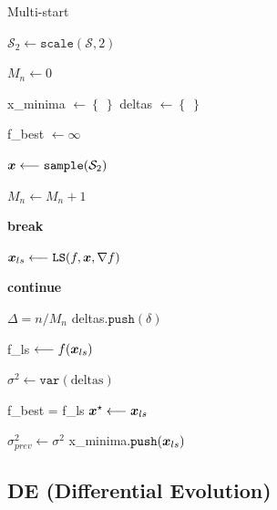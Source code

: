\begin{algorithm}
\caption{Multi-start}\label{algo:multistart}
\vspace{8pt}
\nosemic
\SetAlgoLined
{}

$\mathcal{S}_2 \longleftarrow \texttt{scale}(\mathcal{S}, 2) $ \;

$M_n \longleftarrow 0$ \;

x\_minima $ \longleftarrow \left\lbrace \: \right\rbrace$ \;
deltas $ \longleftarrow \left\lbrace \: \right\rbrace$ \;

f\_best $\longleftarrow \infty$ \;

 {

     {
        $\boldsymbol{x} \longleftarrow \texttt{sample}(\mathcal{S}_2) $ \;

        $M_n \longleftarrow M_n + 1$ \;

         {
            \textbf{break} \;
        }
    }

    $\boldsymbol{x}_{ls} \longleftarrow \texttt{LS}( f, \boldsymbol{x}, \nabla f ) $\;

     {
        \textbf{continue} \;
    }

    $\Delta = n / M_n$ \;
    deltas$.\texttt{push}(\delta)$ \;

    f\_ls $\longleftarrow f(\boldsymbol{x}_{ls}) $ \;

    $\sigma^2 \longleftarrow \texttt{var}(\text{deltas})$ \;

     {
        f\_best = f\_ls \;
        $\boldsymbol{x}^\star \longleftarrow \boldsymbol{x}_{ls}$ \;
    }

     {
        $\sigma^2_{prev} \longleftarrow \sigma^2$ \;
        x\_minima$.\texttt{push}( \boldsymbol{x}_{ls} )$ \;
    } 
}
\;

\end{algorithm}

\subsection{DE (Differential Evolution)}
\label{compare:de}


